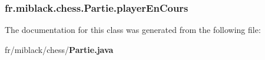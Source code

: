 \subsubsection[{player\-En\-Cours}]{ fr.\-miblack.\-chess.\-Partie.\-player\-En\-Cours\hspace{0.3cm}{\ttfamily [private]}}\label{classfr_1_1miblack_1_1chess_1_1Partie_a6a394463790440d08962247acd554185}


The documentation for this class was generated from the following file\-:\begin{DoxyCompactItemize}
\item 
fr/miblack/chess/{\bf Partie.\-java}\end{DoxyCompactItemize}
